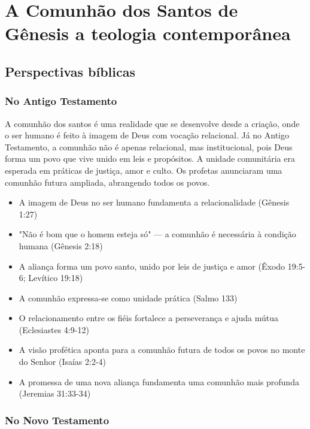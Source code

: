 \newpage

\section{A Comunhão dos Santos de Gênesis a teologia contemporânea}

\subsection{Perspectivas bíblicas}

\subsubsection{No Antigo Testamento}
A comunhão dos santos é uma realidade que se desenvolve desde a criação, onde o ser humano é feito à imagem de Deus com vocação relacional. Já no Antigo Testamento, a comunhão não é apenas relacional, mas institucional, pois Deus forma um povo que vive unido em leis e propósitos. A unidade comunitária era esperada em práticas de justiça, amor e culto. Os profetas anunciaram uma comunhão futura ampliada, abrangendo todos os povos.

\begin{itemize}
\item A imagem de Deus no ser humano fundamenta a relacionalidade (Gênesis 1:27)
\item "Não é bom que o homem esteja só" — a comunhão é necessária à condição humana (Gênesis 2:18)
\item A aliança forma um povo santo, unido por leis de justiça e amor (Êxodo 19:5-6; Levítico 19:18)
\item A comunhão expressa-se como unidade prática (Salmo 133)
\item O relacionamento entre os fiéis fortalece a perseverança e ajuda mútua (Eclesiastes 4:9-12)
\item A visão profética aponta para a comunhão futura de todos os povos no monte do Senhor (Isaías 2:2-4)
\item A promessa de uma nova aliança fundamenta uma comunhão mais profunda (Jeremias 31:33-34)
\end{itemize}

\subsubsection{No Novo Testamento}

